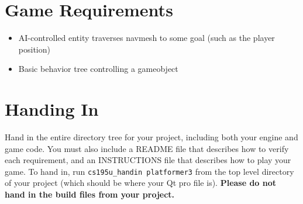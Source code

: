 \documentclass{../cs195u}
\begin{document}
 \section*{Game Requirements}
  \begin{itemize}
    \item AI-controlled entity traverses navmesh to some goal (such as the player position)
    \item Basic behavior tree controlling a gameobject
   \end{itemize}

 \section*{Handing In}
Hand in the entire directory tree for your project, including both your engine and game code. You must also include a README file that describes how to verify each requirement, and an INSTRUCTIONS file that describes how to play your game. To hand in, run \texttt{cs195u\_handin platformer3} from the top level directory of your project (which should be where your Qt pro file is). \textbf{Please do not hand in the build files from your project.}
\end{document}
